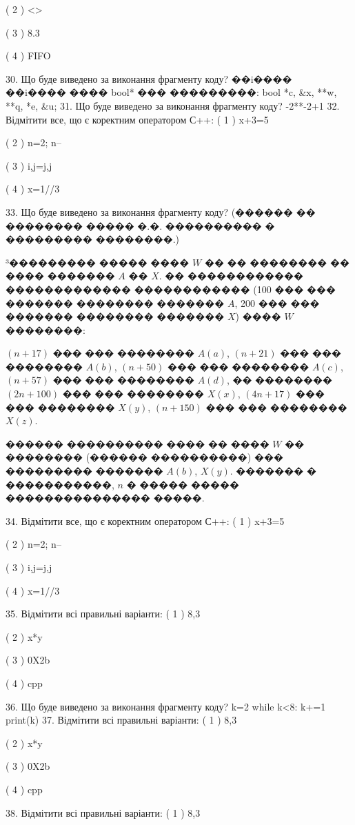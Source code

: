 \documentclass[11pt]{article}
\begin{document}
( 2 ) <>

( 3 ) 8.3

( 4 ) FIFO

30. Що буде виведено за виконання фрагменту коду?
��i���� ��i���� ���� bool* ��� ���������: bool *c, &x, **w, **q, *e, &u;
31. Що буде виведено за виконання фрагменту коду?
-2**-2+1
32. Відмітити все, що є коректним оператором С++:
( 1 ) x+3=5

( 2 ) n=2; n--

( 3 ) i,j=j,j

( 4 ) x=1//3

33. Що буде виведено за виконання фрагменту коду?
(������ �� �������� ����� �.�. ���������� � ��������� ��������.)\par {\hspace {0.5 cm}}³��������� ����� ���� $W$ �� �� �������� �� ���� ������� $A$ �� $X$. �� ������������ ������������� ������������ (100 ��� ��� ������� �������� ������� $A$,  200 ��� ��� ������� �������� ������� $X$) ���� $W$ ��������:\par {\hspace {0.5 cm}}$(n+17)$ ��� ��� �������� $A(a)$, $(n+21)$ ��� ��� �������� $A(b)$, $(n+50)$ ��� ��� �������� $A(c)$, $(n+57)$ ��� ��� �������� $A(d)$, �� �������� $(2n+100)$ ��� ��� �������� $X(x)$, $(4n+17)$ ��� ��� �������� $X(y)$, $(n+150)$ ��� ��� �������� $X(z)$.\par
{\hspace {0.5 cm}}������ ���������� ���� �� ���� $W$ �� �������� (������ ����������) ��� ��������� ������� $A(b)$, $X(y)$. ������� � �����������, $n$ � ����� ����� ��������������� �����.\par
34. Відмітити все, що є коректним оператором С++:
( 1 ) x+3=5

( 2 ) n=2; n--

( 3 ) i,j=j,j

( 4 ) x=1//3

35. Відмітити всі правильні варіанти:
( 1 ) 8,3

( 2 ) x*y

( 3 ) 0X2b

( 4 ) cpp

36. Що буде виведено за виконання фрагменту коду?
k=2
   while k<8: k+=1
   print(k)
37. Відмітити всі правильні варіанти:
( 1 ) 8,3

( 2 ) x*y

( 3 ) 0X2b

( 4 ) cpp

38. Відмітити всі правильні варіанти:
( 1 ) 8,3
\end{document}
